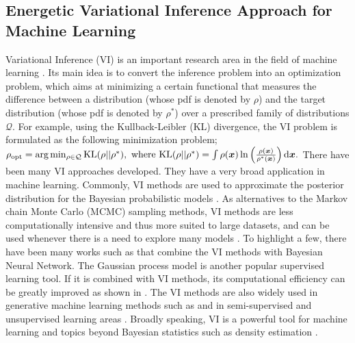 \subsection{Energetic Variational Inference Approach for Machine Learning}
Variational Inference (VI) is an important research area in the field of machine learning \cite{jordan1999introduction, blei2017variational}.
Its main idea is to convert the inference problem into an optimization problem, which aims at minimizing a certain functional that measures the difference between a distribution (whose pdf is denoted by $\rho$) and the target distribution (whose pdf is denoted by $\rho^*$) over a prescribed family of distributions $\mathcal{Q}$.
For example, using the Kullback-Leibler (KL) divergence, the VI problem is formulated as the following minimization problem;
$
\rho_{\text{opt}} =\text{arg}\min_{\rho \in \mathcal{Q} }\mathrm{KL}(\rho||\rho^*), \text{ where } \mathrm{KL}( \rho ||\rho^*)  = \int \rho(\bm{x}) \ln \left( \frac{\rho(\bm{x})}{\rho^*(\bm{x} )} \right) \mathrm{d} \bm{x}.
$
There have been many VI approaches developed. 
They have a very broad application in machine learning.
Commonly, VI methods are used to approximate the posterior distribution for the Bayesian probabilistic models \cite{jordan1999introduction, neal1998view,  wainwright2008graphical, zhang2018advances}.
As alternatives to the Markov chain Monte Carlo (MCMC) sampling methods, VI methods are less computationally intensive and thus more suited to large datasets, and can be used whenever there is a need to explore many models \cite{blei2017variational}.
To highlight a few, there have been many works such as \cite{grave2011practical,welling2017multiplicative, wu2019deterministic,shridhar2019comprehensive} that combine the VI methods with Bayesian Neural Network.
The Gaussian process model is another popular supervised learning tool.
If it is combined with VI methods, its computational efficiency can be greatly improved as shown in \cite{king2006fast, nguyen2013efficient, nguyen2014automated, shetha2015sparse, damianou2016variational, cheng2017variational}.
The VI methods are also widely used in generative machine learning methods such as \cite{kingma2013auto, rezende2014stochastic, goodfellow2014generative,nowozin2016f, hu2017unifying} and in semi-supervised and unsupervised learning areas \cite{kingma2014semi,mnih2016variational,hu2017unifying}.
Broadly speaking, VI is a powerful tool for machine learning \cite{ma2019machine} and topics beyond Bayesian statistics such as density estimation \cite{tabak2010density}.

